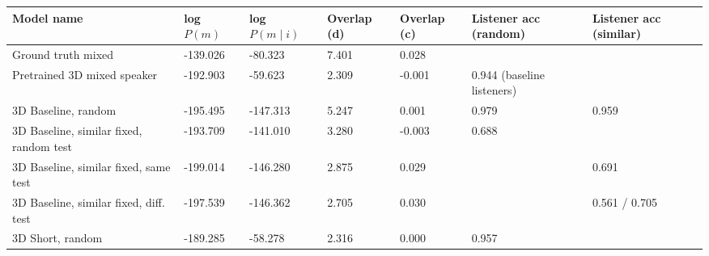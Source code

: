 \begin{table}[] 
	\begin{tabularx}{\textwidth}{|X|l|l|X|X|X|X|}
		\hline
		\textbf{Model name}                                    & \textbf{log $P(m)$} & \textbf{log $P(m \mid i)$} & \textbf{Overlap (d)} & \textbf{Overlap (c)} & \textbf{Listener acc (random)} & \textbf{Listener acc (similar)} \\ \hline
		Ground truth mixed       &     -139.026            &    -80.323             &       7.401        &        0.028        &                 &                \\ \hline
		Pretrained 3D mixed speaker    &      -192.903           &         -59.623               &        2.309              &      -0.001                & 0.944 (baseline listeners)                 &                 \\ \hline
		3D Baseline, random  &       -195.495        &           -147.313           &          5.247            &         0.001             & 0.979                                    &                        0.959                   \\ \hline
		3D Baseline, similar fixed, random test &       -193.709            &    -141.010                  &        3.280            &      -0.003         &            0.688       &                           \\ \hline
		3D Baseline, similar fixed, same test &      -199.014        &        -146.280           &        2.875       &      0.029   &              &          0.691                   \\ \hline
		3D Baseline, similar fixed, diff. test &       -197.539        &       -146.362           &   2.705          & 0.030    &                &              0.561     / 0.705           \\ \hline
		3D Short, random&      -189.285             &      -58.278                  &             2.316        &         0.000             &                   0.957                       &                                           \\ \hline

\end{tabularx}
\end{table}
